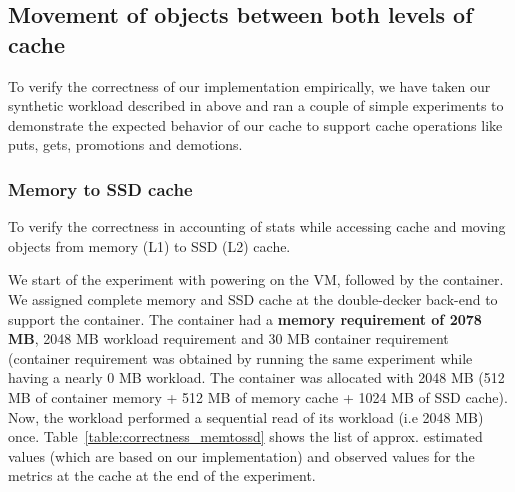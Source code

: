     \subsection{Movement of objects between both levels of cache}
	
	To verify the correctness of our implementation empirically, we have taken our synthetic workload described in 
	above and ran a couple of simple experiments to demonstrate the expected 
	behavior of our cache to support cache operations like puts, gets, promotions and demotions.  
	
	\subsubsection{Memory to SSD cache}

	    To verify the correctness in accounting of stats while accessing cache and moving objects from memory (L1) to SSD (L2) cache.
	    
	      We start of the experiment with powering on the VM, followed by the container. We assigned complete memory and SSD cache 
	    at the double-decker back-end to support the container. The container had a \textbf{memory requirement of 2078 MB}, 2048 MB workload
	    requirement and 30 MB container requirement (container requirement was obtained by running the same experiment while having
	    a nearly 0 MB workload. The container was allocated with 2048 MB (512 MB of container memory + 512 MB of memory cache 
	    + 1024 MB of SSD cache). Now, the workload performed a sequential read of its workload (i.e 2048 MB) once.
	    Table~\ref{table:correctness_memtossd} shows the list of approx. estimated values (which are based on our 
	    implementation) and observed values for the metrics at the cache at the end of the experiment. 
	    
